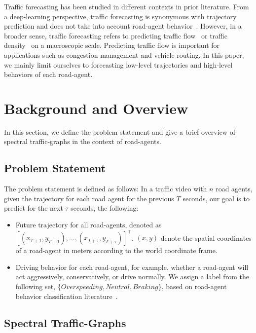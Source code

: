 \documentclass[10pt,twocolumn,letterpaper]{article}
\theoremstyle{plain}
\begin{document}
Traffic forecasting has been studied in different contexts in prior literature. From a deep-learning perspective, traffic forecasting is synonymous with trajectory prediction and does not take into account road-agent behavior~\cite{Argoverse}. However, in a broader sense, traffic forecasting refers to predicting traffic flow~\cite{flow2,flow3,flow4} or traffic density~\cite{forecast1,forecast2,forecast3,forecast4} on a macroscopic scale. Predicting traffic flow is important for applications such as congestion management and vehicle routing. In this paper, we mainly limit ourselves to forecasting low-level trajectories and high-level behaviors of each road-agent.









 \section{Background and Overview}
In this section, we define the problem statement and give a brief overview of spectral traffic-graphs in the context of road-agents. 

\subsection{Problem Statement}
The problem statement is defined as follows: In a traffic video with $n$ road agents, given the trajectory for each road agent for the previous $T$ seconds, our goal is to predict for the next $\tau$ seconds, the following:

\begin{itemize}[noitemsep]
    \item Future trajectory for all road-agents, denoted as $[(x_{T+1},y_{T+1}),\ldots,(x_{T+\tau},y_{T+\tau})]^\top$. $(x,y)$ denote the spatial coordinates of a road-agent in meters according to the world coordinate frame.
    \item Driving behavior for each road-agent, for example, whether a road-agent will act aggressively, conservatively, or drive normally. We assign a label from the following set, $\{ Overspeeding, Neutral, Braking\}$, based on road-agent behavior classification literature~\cite{ernestref15,ernestref16}.
\end{itemize}

\subsection{Spectral Traffic-Graphs}
\label{subsec: spectral graph theory}
\end{document}
